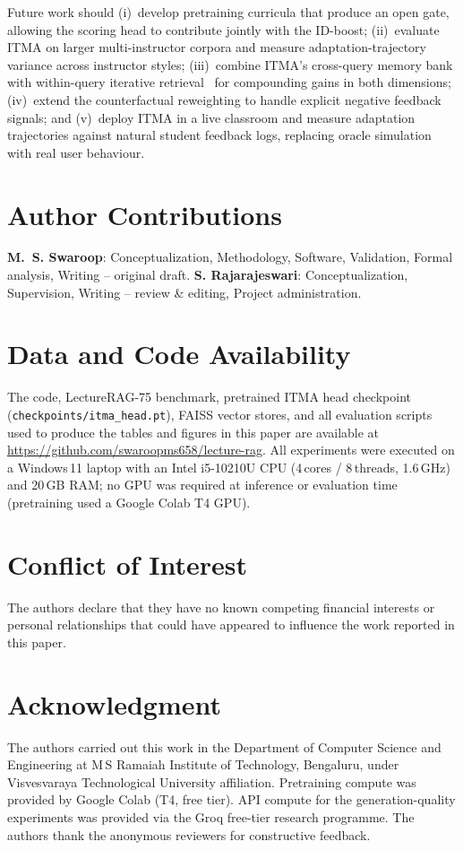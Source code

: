 \documentclass[journal]{IEEEtran}
\begin{document}
Future work should (i)~develop pretraining curricula that produce an
open gate, allowing the scoring head to contribute jointly with the
ID-boost; (ii)~evaluate ITMA on larger multi-instructor corpora and
measure adaptation-trajectory variance across instructor styles;
(iii)~combine ITMA's cross-query memory bank with within-query
iterative retrieval~\cite{jiang2023active} for compounding gains in
both dimensions; (iv)~extend the counterfactual reweighting to handle
explicit negative feedback signals; and (v)~deploy ITMA in a live
classroom and measure adaptation trajectories against natural student
feedback logs, replacing oracle simulation with real user behaviour.

\section*{Author Contributions}
\textbf{M.~S. Swaroop}: Conceptualization, Methodology, Software,
Validation, Formal analysis, Writing -- original draft.
\textbf{S. Rajarajeswari}: Conceptualization, Supervision,
Writing -- review \& editing, Project administration.

\section*{Data and Code Availability}
The code, LectureRAG-75 benchmark, pretrained ITMA head checkpoint
(\texttt{checkpoints/itma\_head.pt}), FAISS vector stores, and all
evaluation scripts used to produce the tables and figures in this
paper are available at
\url{https://github.com/swaroopms658/lecture-rag}.  All experiments
were executed on a Windows\,11 laptop with an Intel i5-10210U CPU
(4\,cores / 8\,threads, 1.6\,GHz) and 20\,GB RAM; no GPU was required
at inference or evaluation time (pretraining used a Google Colab T4
GPU).

\section*{Conflict of Interest}
The authors declare that they have no known competing financial
interests or personal relationships that could have appeared to
influence the work reported in this paper.

\section*{Acknowledgment}
The authors carried out this work in the Department of Computer
Science and Engineering at M\,S Ramaiah Institute of Technology,
Bengaluru, under Visvesvaraya Technological University affiliation.
Pretraining compute was provided by Google Colab (T4, free tier).
API compute for the generation-quality experiments was provided via
the Groq free-tier research programme.  The authors thank the
anonymous reviewers for constructive feedback.
\end{document}

